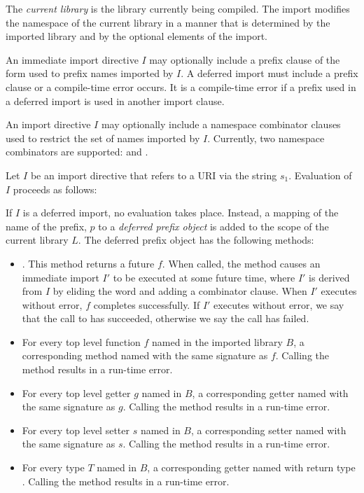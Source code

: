\documentclass{article}
\begin{document}
\LMHash{}
The {\em current library} is the library currently being compiled.
The import modifies the namespace of the current library in a manner that is determined by the imported library and by the optional elements of the import.

\LMHash{}
An immediate import directive $I$ may optionally include a prefix clause of the form \code{\AS{} \id} used to prefix names imported by $I$.
A deferred import must include a prefix clause or a compile-time error occurs.
It is a compile-time error if a prefix used in a deferred import is used in another import clause.

\LMHash{}
An import directive $I$ may optionally include a namespace combinator clauses used to restrict the set of names imported by $I$.
Currently, two namespace combinators are supported: \HIDE{} and \SHOW{}.

\LMHash{}
Let $I$ be an import directive that refers to a URI via the string $s_1$.
Evaluation of $I$ proceeds as follows:

\LMHash{}
If $I$ is a deferred import, no evaluation takes place.
Instead, a mapping of the name of the prefix, $p$ to a {\em deferred prefix object} is added to the scope of the current library $L$.
The deferred prefix object has the following methods:

\begin{itemize}
\item {}.
This method returns a future $f$.
When called, the method causes an immediate import $I'$ to be executed at some future time, where $I'$ is derived from $I$ by eliding the word \DEFERRED{} and adding a \HIDE{}  combinator clause.
When $I'$ executes without error, $f$ completes successfully.
If $I'$ executes without error, we say that the call to  has succeeded, otherwise we say the call has failed.
\item For every top level function $f$ named \id{} in the imported library $B$, a corresponding method named \id{} with the same signature as $f$.
Calling the method results in a run-time error.
\item For every top level getter $g$ named \id{} in $B$, a corresponding getter named \id{} with the same signature as $g$.
Calling the method results in a run-time error.
\item For every top level setter $s$ named \id{} in $B$, a corresponding setter named \id{} with the same signature as $s$.
Calling the method results in a run-time error.
\item For every type $T$ named \id{} in $B$, a corresponding getter named \id{} with return type .
Calling the method results in a run-time error.
\end{itemize}
\end{document}
